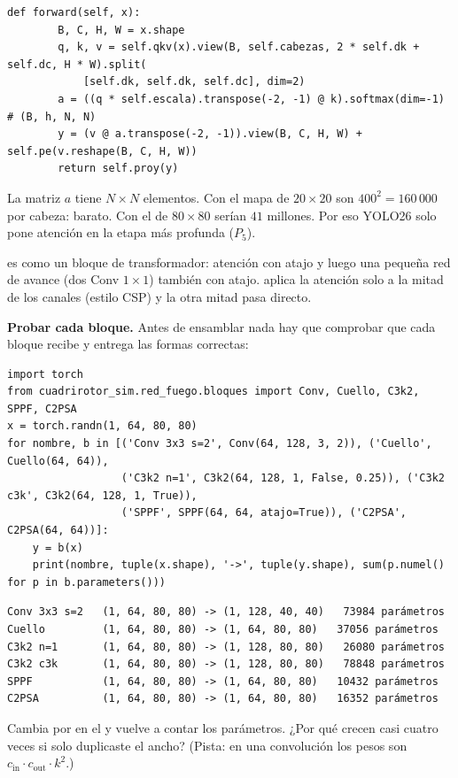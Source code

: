 \begin{lstlisting}[style=py]
    def forward(self, x):
        B, C, H, W = x.shape
        q, k, v = self.qkv(x).view(B, self.cabezas, 2 * self.dk + self.dc, H * W).split(
            [self.dk, self.dk, self.dc], dim=2)
        a = ((q * self.escala).transpose(-2, -1) @ k).softmax(dim=-1)   # (B, h, N, N)
        y = (v @ a.transpose(-2, -1)).view(B, C, H, W) + self.pe(v.reshape(B, C, H, W))
        return self.proy(y)
\end{lstlisting}

\begin{aviso}
La matriz $a$ tiene $N\times N$ elementos. Con el mapa de $20\times20$ son
$400^2 = 160\,000$ por cabeza: barato. Con el de $80\times80$ serían
$41$ millones. Por eso YOLO26 solo pone atención en la etapa más profunda
($P_5$).
\end{aviso}

 es como un bloque de transformador: atención con atajo y luego
una pequeña red de avance (dos Conv $1\times1$) también con atajo.
 aplica la atención solo a la mitad de los canales (estilo CSP) y la
otra mitad pasa directo.

 \textbf{Probar cada bloque.}
Antes de ensamblar nada hay que comprobar que cada bloque recibe y entrega las
formas correctas:
\begin{lstlisting}[style=py]
import torch
from cuadrirotor_sim.red_fuego.bloques import Conv, Cuello, C3k2, SPPF, C2PSA
x = torch.randn(1, 64, 80, 80)
for nombre, b in [('Conv 3x3 s=2', Conv(64, 128, 3, 2)), ('Cuello', Cuello(64, 64)),
                  ('C3k2 n=1', C3k2(64, 128, 1, False, 0.25)), ('C3k2 c3k', C3k2(64, 128, 1, True)),
                  ('SPPF', SPPF(64, 64, atajo=True)), ('C2PSA', C2PSA(64, 64))]:
    y = b(x)
    print(nombre, tuple(x.shape), '->', tuple(y.shape), sum(p.numel() for p in b.parameters()))
\end{lstlisting}

\begin{resultado}
\begin{lstlisting}
Conv 3x3 s=2   (1, 64, 80, 80) -> (1, 128, 40, 40)   73984 parámetros
Cuello         (1, 64, 80, 80) -> (1, 64, 80, 80)   37056 parámetros
C3k2 n=1       (1, 64, 80, 80) -> (1, 128, 80, 80)   26080 parámetros
C3k2 c3k       (1, 64, 80, 80) -> (1, 128, 80, 80)   78848 parámetros
SPPF           (1, 64, 80, 80) -> (1, 64, 80, 80)   10432 parámetros
C2PSA          (1, 64, 80, 80) -> (1, 64, 80, 80)   16352 parámetros
\end{lstlisting}
\end{resultado}

\begin{ejercicio}
Cambia  por  en el  y vuelve a contar los
parámetros. ¿Por qué crecen casi cuatro veces si solo duplicaste el ancho?
(Pista: en una convolución los pesos son $c_{\text{in}}\cdot c_{\text{out}}\cdot k^2$.)
\end{ejercicio}
